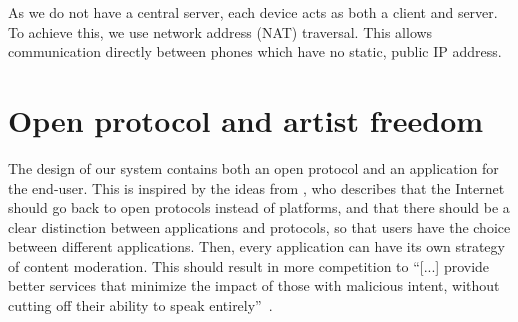 As we do not have a central server, each device acts as both a client and server. To achieve this, we use network address (NAT) traversal. This allows communication directly between phones which have no static, public IP address.






\section{Open protocol and artist freedom}
The design of our system contains both an open protocol and an application for the end-user. This is inspired by the ideas from \cite{masnick2019protocols}, who describes that the Internet should go back to open protocols instead of platforms, and that there should be a clear distinction between applications and protocols, so that users have the choice between different applications. Then, every application can have its own strategy of content moderation. This should result in more competition to ``[...] provide better services that minimize the impact of those
with malicious intent, without cutting off their ability to speak entirely''~\citep{masnick2019protocols}.

